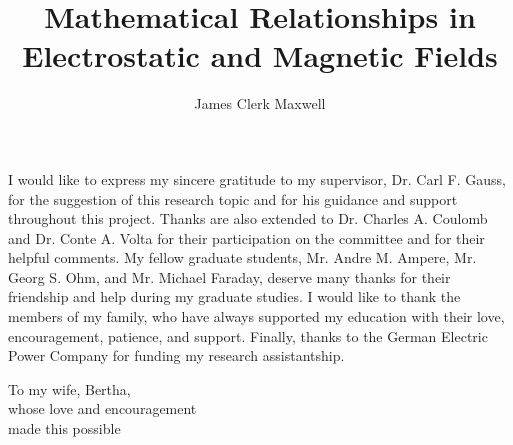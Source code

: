 \title{Mathematical Relationships in Electrostatic and Magnetic Fields}
\author{James Clerk Maxwell}

\fourthmember{}
\fifthmember{}

\maketitle
\makeapproval					%
\makestatement

\begin{acknowledgments}
I would like to express my sincere gratitude to my supervisor,
Dr. Carl F. Gauss, for the suggestion of this research topic and for his
guidance and support throughout this project.
Thanks are also extended to Dr. Charles A. Coulomb and Dr. Conte A. Volta
for their participation on the committee and for their helpful comments.
My fellow graduate students, Mr. Andre M. Ampere, Mr. Georg S. Ohm, and
Mr. Michael Faraday, deserve many thanks for their friendship and help during
my graduate studies.
I would like to thank the members of my family, who have always supported my
education with their love, encouragement, patience, and support.
Finally, thanks to the German Electric Power Company for funding my research
assistantship.
\end{acknowledgments}

\begin{dedication}
To my wife, Bertha,\\
whose love and encouragement\\
made this possible
\end{dedication}

\tableofcontents
\listoffigures
\newpage
\listoftables
\newpage
\begin{abstract}  \end{abstract}	%
